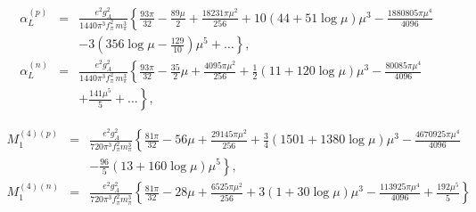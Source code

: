 \documentclass[12pt,preprint,tightenlines,
showpacs,preprintnumbers,amsmath,amssymb,
a4paper,nofootinbib]{revtex4-1}
\def\bea{\begin{eqnarray}}
\def\eea{\end{eqnarray}}
\def\nn{\nonumber}
\begin{document}
\bea
\alpha_{L}^{(p)} &=&
 \frac{e^2 g_A^2}{1440 \pi^3 f_\pi^2\,  m_\pi^3}\left\{ \frac{93 \pi}{32} - \frac{89 \mu}{2} + \frac{18231 \pi \mu^2}{256} +10 (44+ 51 \log\mu )\mu^3 -\frac{1880805 \pi \mu^4}{4096} \right. \\
&&\left. - 3\left(356 \log\mu -\frac{129}{10}\right)\mu^5 +\dots  \right\},\nn\\
\alpha_{L}^{(n)} &= &
 \frac{e^2 g_A^2}{1440 \pi^3 f_\pi^2\,  m_\pi^3}\left\{ \frac{93 \pi}{32} - \frac{35}{2} \mu + \frac{4095 \pi \mu^2}{256} + \frac{1}{2}(11+ 120 \log\mu )\mu^3 -\frac{80085 \pi \mu^4}{4096}\right. \\
 &&\left.+ \frac{141\mu^5}{5} +\dots  \right\},\nn
\eea


\bea
M_1^{(4)(p)} &=&\frac{e^2 g_A^2}{720 \pi^3 f_\pi^2 m_\pi^3}\left\{\frac{81 \pi}{32}-56 \mu+\frac{29145\pi\mu^2}{256}+\frac{3}{4}\left(1501+1380 \log \mu \right)\mu^3-\frac{4670925\pi \mu^4}{4096}\right.\\
&&\left.-\frac{96}{5}\left(13+160\log \mu\right)\mu^5\right\},\nn\\
M_1^{(4)(n)} &= &\frac{e^2 g_A^2}{720 \pi^3 f_\pi^2 m_\pi^3}\left\{\frac{81\pi}{32}-28\mu+\frac{6525\pi\mu^2}{256}+3\left(1+30\log \mu\right)\mu^3-\frac{113925\pi\mu^4}{4096}+\frac{192\mu^5}{5}\right\}
\eea
\end{document}
